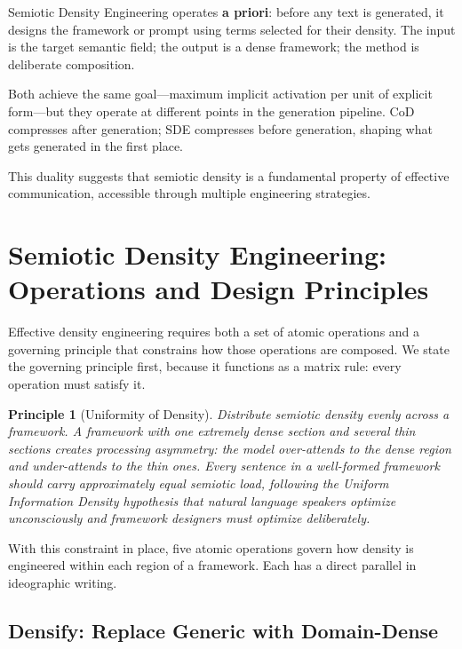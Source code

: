 \documentclass[12pt,a4paper]{article}
\newtheorem{principle}{Principle}[section]
\begin{document}
Semiotic Density Engineering operates \textbf{a priori}: before any text is generated, it designs the framework or prompt using terms selected for their density.
The input is the target semantic field; the output is a dense framework; the method is deliberate composition.

Both achieve the same goal---maximum implicit activation per unit of explicit form---but they operate at different points in the generation pipeline.
CoD compresses after generation; SDE compresses before generation, shaping what gets generated in the first place.

This duality suggests that semiotic density is a fundamental property of effective communication, accessible through multiple engineering strategies.


\section{Semiotic Density Engineering: Operations and Design Principles}
\label{sec:operations}

Effective density engineering requires both a set of atomic operations and a governing principle that constrains how those operations are composed.
We state the governing principle first, because it functions as a matrix rule: every operation must satisfy it.

\begin{principle}[Uniformity of Density]
\label{principle:uid}
Distribute semiotic density evenly across a framework.
A framework with one extremely dense section and several thin sections creates processing asymmetry: the model over-attends to the dense region and under-attends to the thin ones.
Every sentence in a well-formed framework should carry approximately equal semiotic load, following the Uniform Information Density hypothesis \cite{frank2008} that natural language speakers optimize unconsciously and framework designers must optimize deliberately.
\end{principle}

With this constraint in place, five atomic operations govern how density is engineered within each region of a framework.
Each has a direct parallel in ideographic writing.

\subsection{Densify: Replace Generic with Domain-Dense}
\label{subsec:densify}
\end{document}
